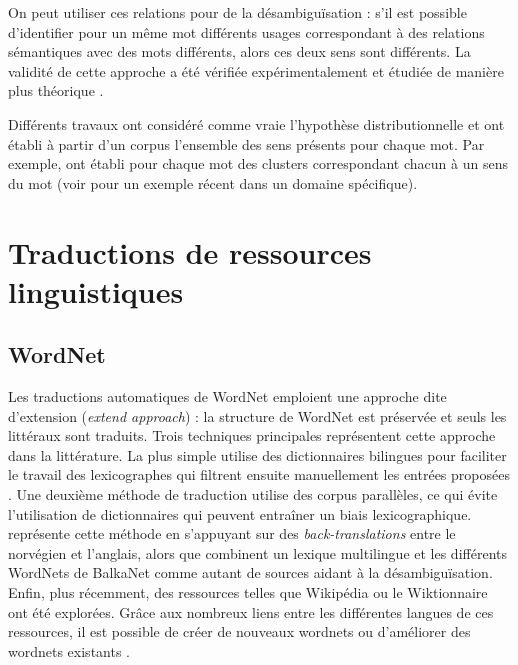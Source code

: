 On peut utiliser ces relations pour de la désambiguïsation : s'il est possible
d'identifier pour un même mot différents usages correspondant à des relations
sémantiques avec des mots différents, alors ces deux sens sont différents. La
validité de cette approche a été vérifiée expérimentalement
\citep{yarowsky1993one,pantel2002discovering,claire} et étudiée de manière plus
théorique \citep{sahlgren2006word,sahlgren2008distributional}.

Différents travaux ont considéré comme vraie l'hypothèse distributionnelle et
ont établi à partir d'un corpus l'ensemble des sens présents pour chaque mot.
Par exemple,
\cite{schutze1998automatic,pantel2002discovering,niu2007three,pedersen2010duluth}
ont établi pour chaque mot des clusters correspondant chacun à un sens du mot
(voir \cite{liu2012semantic} pour un exemple récent dans un domaine
spécifique).





\section{Traductions de ressources linguistiques}
\label{sec:translation}

\subsection{WordNet}

Les traductions automatiques de WordNet emploient une approche dite d'extension
(\textit{extend approach}) : la structure de WordNet est préservée et seuls les
littéraux sont traduits. Trois techniques principales représentent cette
approche dans la littérature. La plus simple utilise des dictionnaires
bilingues pour faciliter le travail des lexicographes qui filtrent ensuite
manuellement les entrées proposées
\citep{vossen1998eurowordnet,pianta2002developing,tufis2004balkanet}. Une
deuxième méthode de traduction utilise des corpus parallèles, ce qui évite
l'utilisation de dictionnaires qui peuvent entraîner un biais lexicographique.
\cite{dyvik2004translations} représente cette méthode en s'appuyant sur des
\textit{back-translations} entre le norvégien et l'anglais, alors que
\citep{sagot2008construction} combinent un lexique multilingue et les
différents WordNets de BalkaNet comme autant de sources aidant à la
désambiguïsation. Enfin, plus récemment, des ressources telles que Wikipédia ou
le Wiktionnaire ont été explorées. Grâce aux nombreux liens entre les
différentes langues de ces ressources, il est possible de créer de nouveaux
wordnets \citep{demelo2009towards,navigli2010babelnet} ou d'améliorer des
wordnets existants \citep{hanoka2012wordnet}.

